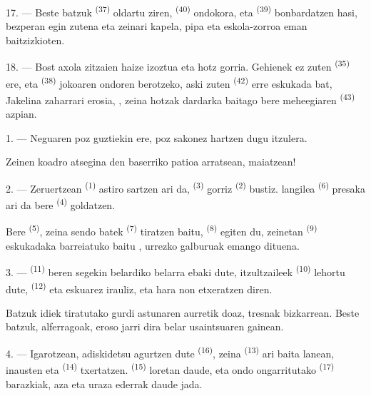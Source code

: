 17. --- Beste batzuk  \textsuperscript{(37)} oldartu
ziren,  \textsuperscript{(40)} ondokora, eta 
\textsuperscript{(39)} bonbardatzen hasi, bezperan egin zutena eta zeinari kapela,
pipa eta eskola-zorroa eman baitzizkioten.

18. --- Bost axola zitzaien haize izoztua eta hotz gorria. Gehienek ez zuten
 \textsuperscript{(35)} ere, eta 
\textsuperscript{(38)} jokoaren ondoren berotzeko, aski zuten 
\textsuperscript{(42)} erre eskukada bat, Jakelina zaharrari erosia,
, zeina hotzak dardarka baitago bere 
meheegiaren \textsuperscript{(43)} azpian.

\VUsaut{3.0mm}
\VUsaut{3.0mm}

\VUsaut{4.0mm}

1. --- Neguaren poz guztiekin ere, poz sakonez hartzen dugu 
itzulera.

Zeinen koadro atsegina den baserriko patioa arratsean, maiatzean!

2. --- Zeruertzean  \textsuperscript{(1)} astiro sartzen ari da,
 \textsuperscript{(3)}  gorriz \textsuperscript{(2)}
bustiz.  langilea \textsuperscript{(6)} presaka ari da bere
 \textsuperscript{(4)} goldatzen.

Bere  \textsuperscript{(5)}, zeina  sendo batek
\textsuperscript{(7)} tiratzen baitu,  \textsuperscript{(8)} egiten
du, zeinetan  \textsuperscript{(9)} eskukadaka barreiatuko baitu
, urrezko galburuak emango dituena.

3. ---  \textsuperscript{(11)} beren segekin belardiko belarra
ebaki dute, itzultzaileek  \textsuperscript{(10)} lehortu dute,
 \textsuperscript{(12)} eta eskuarez irauliz, eta hara non
etxeratzen diren.

Batzuk idiek tiratutako gurdi astunaren aurretik doaz, tresnak bizkarrean. Beste
batzuk, alferragoak, eroso jarri dira belar usaintsuaren gainean.

4. --- Igarotzean, adiskidetsu agurtzen dute 
\textsuperscript{(16)}, zeina  \textsuperscript{(13)} ari baita
lanean,  inausten eta 
\textsuperscript{(14)} txertatzen.  \textsuperscript{(15)}
loretan daude, eta ondo ongarritutako  \textsuperscript{(17)}
barazkiak, aza eta uraza ederrak daude jada.

